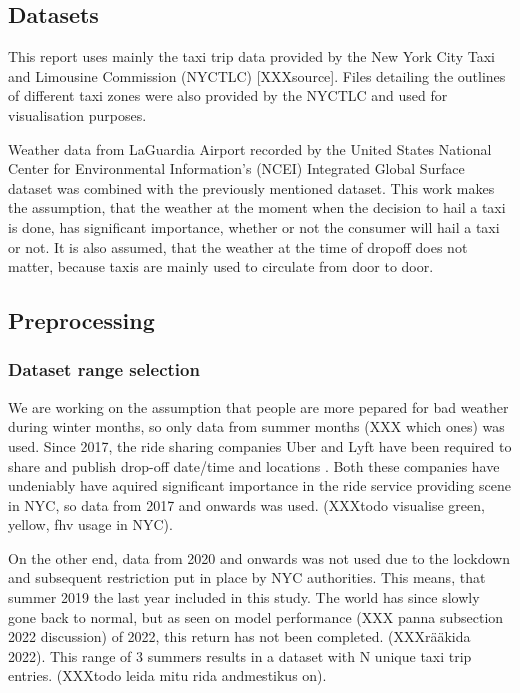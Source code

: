 \documentclass[11pt]{article}
\begin{document}
\subsection{Datasets}
This report uses mainly the taxi trip data provided by the New York City Taxi and Limousine Commission (NYCTLC) [XXXsource]. Files detailing the outlines of different taxi zones were also provided by the NYCTLC and used for visualisation purposes.

Weather data from LaGuardia Airport recorded by the United States National Center for Environmental Information's (NCEI) Integrated Global Surface dataset \cite{weatherData} was combined with the previously mentioned dataset. This work makes the assumption, that the weather at the moment when the decision to hail a taxi is done, has significant importance, whether or not the consumer will hail a taxi or not. It is also assumed, that the weather at the time of dropoff does not matter, because taxis are mainly used to circulate from door to door.

\subsection{Preprocessing}

\subsubsection{Dataset range selection}

We are working on the assumption that people are more pepared for bad weather during winter months, so only data from summer months (XXX which ones) was used. Since 2017, the ride sharing companies Uber and Lyft have been required to share and publish drop-off date/time and locations \cite{tripUserGuide}. Both these companies have undeniably have aquired significant importance in the ride service providing scene in NYC, so data from 2017 and onwards was used. (XXXtodo visualise green, yellow, fhv usage in NYC).

On the other end, data from 2020 and onwards was not used due to the lockdown and subsequent restriction put in place by NYC authorities. This means, that summer 2019 the last year included in this study. The world has since slowly gone back to normal, but as seen on model performance (XXX panna subsection 2022 discussion) of 2022, this return has not been completed. (XXXrääkida 2022). This range of 3 summers results in a dataset with N unique taxi trip entries. (XXXtodo leida mitu rida andmestikus on).
\end{document}

